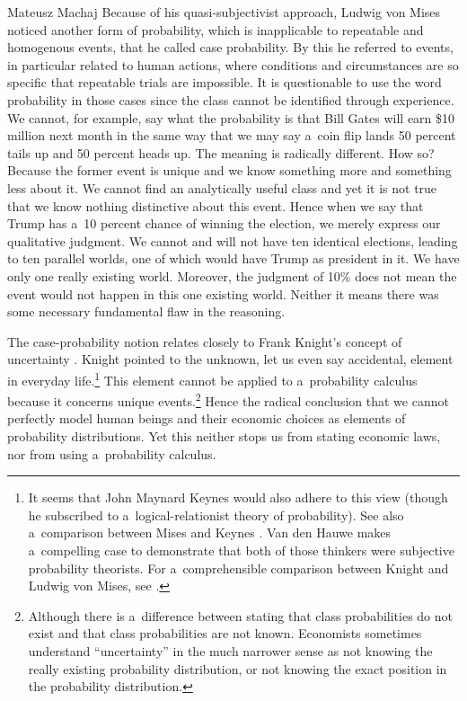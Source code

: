 \begin{artengenv}{Mateusz Machaj}
Because of his quasi-subjectivist approach, Ludwig von Mises noticed another form of probability, which is inapplicable to repeatable and homogenous events, that he called case probability. By this he referred to events, in particular related to human actions, where conditions and circumstances are so specific that repeatable trials are impossible. It is questionable to use the word probability in those cases since the class cannot be identified through experience. We cannot, for example, say what the probability is that Bill Gates will earn \$10 million next month in the same way that we may say a~coin flip lands 50 percent tails up and 50 percent heads up. The meaning is radically different. How so? Because the former event is unique and we know something more and something less about it. We cannot find an analytically useful class and yet it is not true that we know nothing distinctive about this event. Hence when we say that Trump has a~10 percent chance of winning the election, we merely express our qualitative judgment. We cannot and will not have ten identical elections, leading to ten parallel worlds, one of which would have Trump as president in it. We have only one really existing world. Moreover, the judgment of 10\% does not mean the event would not happen in this one existing world. Neither it means there was some necessary fundamental flaw in the reasoning.



The case-probability notion relates closely to Frank Knight's concept of uncertainty 
\parencite*[][pp.226–232]{knight_risk_1971}. %
 Knight pointed to the unknown, let us even say accidental, element in everyday life.\footnote{It seems that John Maynard Keynes 
\parencite*[][]{keynes_treatise_1921} %
 would also adhere to this view (though he subscribed to a~logical-relationist theory of probability). See also a~comparison between Mises and Keynes 
\parencite[][]{hauwe_john_2007}. %
 Van den Hauwe makes a~compelling case to demonstrate that both of those thinkers were subjective probability theorists. For a~comprehensible comparison between Knight and Ludwig von Mises, see 
\parencite[][]{hoppe_limits_2007}.%
} This element cannot be applied to a~probability calculus because it concerns unique events.\footnote{Although there is a~difference between stating that class probabilities do not exist and that class probabilities are not known. Economists sometimes understand ``uncertainty'' in the much narrower sense as not knowing the really existing probability distribution, or not knowing the exact position in the probability distribution.} Hence the radical conclusion that we cannot perfectly model human beings and their economic choices as elements of probability distributions. Yet this neither stops us from stating economic laws, nor from using a~probability calculus.




\end{artengenv}
